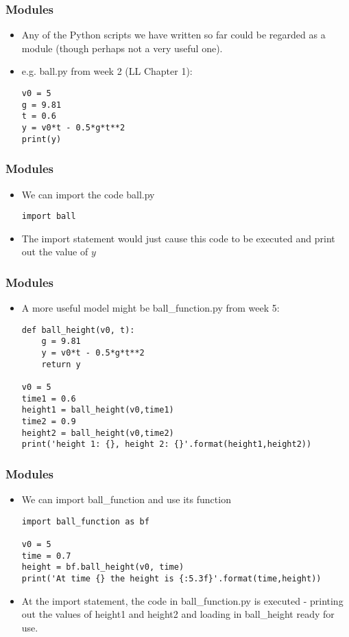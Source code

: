 \documentclass[english,14pt]{beamer}
\begin{document}
\begin{frame}[fragile]
\frametitle{Modules}
	\begin{itemize}
		\item Any of the Python scripts we have written so far could be regarded as a module (though perhaps not a very useful one).
		\item e.g. ball.py from week 2 (LL Chapter 1):
\begin{lstlisting}[style=CStyle]
v0 = 5
g = 9.81                     
t = 0.6
y = v0*t - 0.5*g*t**2
print(y)
\end{lstlisting}
    \end{itemize}
\end{frame}

\begin{frame}[fragile]
\frametitle{Modules}
	\begin{itemize}
		\item We can import the code ball.py 
\begin{lstlisting}[style=CStyle]
import ball
\end{lstlisting}
		\item The import statement would just cause this code to be executed and print out the value of $y$
    \end{itemize}
\end{frame}

\begin{frame}[fragile]
\frametitle{Modules}
	\begin{itemize}
		\item A more useful model might be ball\_function.py from week 5:

\begin{lstlisting}[style=CStyle]
def ball_height(v0, t):           
    g = 9.81                      
    y = v0*t - 0.5*g*t**2
    return y                      
    
v0 = 5
time1 = 0.6
height1 = ball_height(v0,time1)
time2 = 0.9
height2 = ball_height(v0,time2)
print('height 1: {}, height 2: {}'.format(height1,height2))
\end{lstlisting}
	 \end{itemize}
\end{frame}

\begin{frame}[fragile]
\frametitle{Modules}
	\begin{itemize}
		\item We can import ball\_function and use its function
\begin{lstlisting}[style=CStyle]
import ball_function as bf

v0 = 5
time = 0.7
height = bf.ball_height(v0, time)
print('At time {} the height is {:5.3f}'.format(time,height))
\end{lstlisting}
		\item At the import statement, the code in ball\_function.py is executed - printing out the values of height1 and height2 and loading in ball\_height ready for use.
    \end{itemize}
\end{frame}
\end{document}
